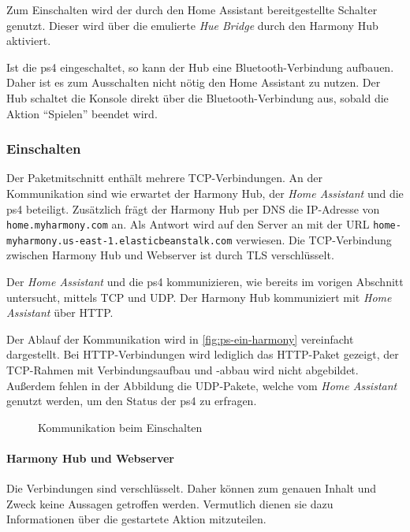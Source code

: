 Zum Einschalten wird der durch den Home Assistant bereitgestellte Schalter genutzt.
Dieser wird über die emulierte \textit{Hue Bridge} durch den Harmony Hub aktiviert.

Ist die \ac{ps4} eingeschaltet, so kann der Hub eine Bluetooth-Verbindung aufbauen.
Daher ist es zum Ausschalten nicht nötig den Home Assistant zu nutzen.
Der Hub schaltet die Konsole direkt über die Bluetooth-Verbindung aus,
sobald die Aktion \enquote{Spielen} beendet wird.

\subsubsection{Einschalten}
Der Paketmitschnitt enthält mehrere TCP-Verbindungen.
An der Kommunikation sind wie erwartet der Harmony Hub, der \textit{Home Assistant} und die \ac{ps4} beteiligt.
Zusätzlich frägt der Harmony Hub per DNS die IP-Adresse von \nolinkurl{home.myharmony.com} an.
Als Antwort wird auf den Server an mit der URL \nolinkurl{home-myharmony.us-east-1.elasticbeanstalk.com} verwiesen.
Die TCP-Verbindung zwischen Harmony Hub und Webserver ist durch TLS verschlüsselt.

Der \textit{Home Assistant} und die \ac{ps4} kommunizieren, wie bereits im vorigen Abschnitt untersucht, mittels TCP und UDP.
Der Harmony Hub kommuniziert mit \textit{Home Assistant} über HTTP.

Der Ablauf der Kommunikation wird in \autoref{fig:ps-ein-harmony} vereinfacht dargestellt.
Bei HTTP-Verbindungen wird lediglich das HTTP-Paket gezeigt,
der TCP-Rahmen mit Verbindungsaufbau und -abbau wird nicht abgebildet.
Außerdem fehlen in der Abbildung die UDP-Pakete,
welche vom \textit{Home Assistant} genutzt werden,
um den Status der \ac{ps4} zu erfragen.

\begin{figure}
    \centering
    \resizebox{\textwidth}{!}{
        
    }
    \caption{Kommunikation beim Einschalten}
    \label{fig:ps-ein-harmony}
\end{figure}

\newpage



\paragraph{Harmony Hub und Webserver}
Die Verbindungen sind verschlüsselt.
Daher können zum genauen Inhalt und Zweck keine Aussagen getroffen werden.
Vermutlich dienen sie dazu Informationen über die gestartete Aktion mitzuteilen.

